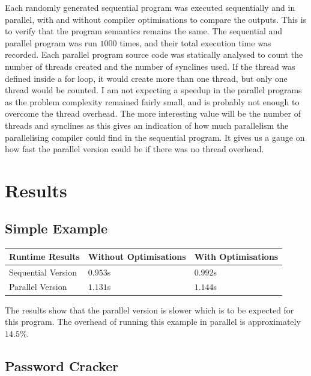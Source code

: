 Each randomly generated sequential program was executed sequentially and in parallel, with and without compiler optimisations to compare the outputs. This is to verify that the program semantics remains the same. The sequential and parallel program was run $1000$ times, and their total execution time was recorded. Each parallel program source code was statically analysed to count the number of threads created and the number of synclines used. If the thread was defined inside a for loop, it would create more than one thread, but only one thread would be counted. I am not expecting a speedup in the parallel programs as the problem complexity remained fairly small, and is probably not enough to overcome the thread overhead. The more interesting value will be the number of threads and synclines as this gives an indication of how much parallelism the parallelising compiler could find in the sequential program. It gives us a gauge on how fast the parallel version could be if there was no thread overhead.

\section{Results}
\subsection{Simple Example}

\begin{tabularx}{\textwidth}{ | >{\centering\arraybackslash}X | >{\centering\arraybackslash}X | >{\centering\arraybackslash}X |}
	\hline
    Runtime Results & Without Optimisations & With Optimisations \\
    \hline
    Sequential Version & $0.953$s & $0.992$s \\
    \hline
    Parallel Version   & $1.131$s & $1.144$s \\
    \hline
\end{tabularx}

The results show that the parallel version is slower which is to be expected for this program. The overhead of running this example in parallel is approximately $14.5\%$.

\subsection{Password Cracker}

